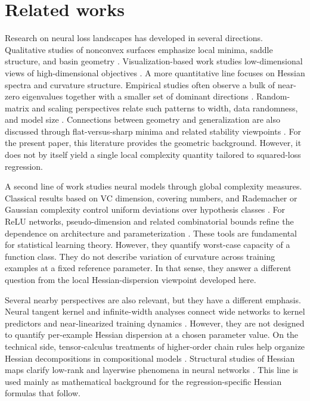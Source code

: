 \documentclass[10pt,letterpaper]{article}
\theoremstyle{definition}
\begin{document}
\section{Related works}\label{sec:related}

Research on neural loss landscapes has developed in several directions. Qualitative studies of nonconvex surfaces emphasize local minima, saddle structure, and basin geometry \cite{choromanska2015,fort2019emergent}. Visualization-based work studies low-dimensional views of high-dimensional objectives \cite{li2018visualizing,fort2019large}. A more quantitative line focuses on Hessian spectra and curvature structure. Empirical studies often observe a bulk of near-zero eigenvalues together with a smaller set of dominant directions \cite{ghorbani2019,sagun2018,papyan2019hessian,wu2022dissecting}. Random-matrix and scaling perspectives relate such patterns to width, data randomness, and model size \cite{pennington2017,xie2022powerlaw}. Connections between geometry and generalization are also discussed through flat-versus-sharp minima and related stability viewpoints \cite{hochreiter1994,neyshabur2017exploring,dinh2017sharp}. For the present paper, this literature provides the geometric background. However, it does not by itself yield a single local complexity quantity tailored to squared-loss regression.

A second line of work studies neural models through global complexity measures. Classical results based on VC dimension, covering numbers, and Rademacher or Gaussian complexity control uniform deviations over hypothesis classes \cite{vapnik1998,bartlett2002}. For ReLU networks, pseudo-dimension and related combinatorial bounds refine the dependence on architecture and parameterization \cite{harvey2019jmlr}. These tools are fundamental for statistical learning theory. However, they quantify worst-case capacity of a function class. They do not describe variation of curvature across training examples at a fixed reference parameter. In that sense, they answer a different question from the local Hessian-dispersion viewpoint developed here.

Several nearby perspectives are also relevant, but they have a different emphasis. Neural tangent kernel and infinite-width analyses connect wide networks to kernel predictors and near-linearized training dynamics \cite{jacot2018ntk,lee2018wide}. However, they are not designed to quantify per-example Hessian dispersion at a chosen parameter value. On the technical side, tensor-calculus treatments of higher-order chain rules help organize Hessian decompositions in compositional models \cite{skorski2019chain}. Structural studies of Hessian maps clarify low-rank and layerwise phenomena in neural networks \cite{wu2022dissecting}. This line is used mainly as mathematical background for the regression-specific Hessian formulas that follow.
\end{document}
